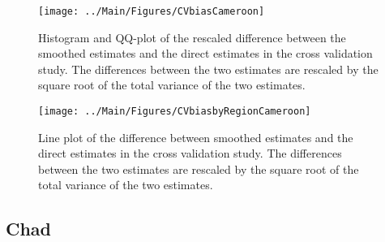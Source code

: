 \documentclass[12pt]{article}\usepackage[]{graphicx}\usepackage[]{color}
\newenvironment{knitrout}{}{} %
\begin{document}
\begin{knitrout}
\color{fgcolor}\begin{figure}[bht]

{\centering \texttt{[image: ../Main/Figures/CVbiasCameroon]} 

}

\caption[Histogram and QQ-plot of the rescaled difference between the smoothed estimates and the direct estimates in the cross validation study]{Histogram and QQ-plot of the rescaled difference between the smoothed estimates and the direct estimates in the cross validation study. The differences between the two estimates are rescaled by the square root of the total variance of the two estimates.}\label{fig:unnamed-chunk-49}
\end{figure}


\end{knitrout}

\begin{knitrout}
\color{fgcolor}\begin{figure}[bht]

{\centering \texttt{[image: ../Main/Figures/CVbiasbyRegionCameroon]} 

}

\caption[Line plot of the difference between smoothed estimates and the direct estimates in the cross validation study]{Line plot of the difference between smoothed estimates and the direct estimates in the cross validation study. The differences between the two estimates are rescaled by the square root of the total variance of the two estimates.}\label{fig:unnamed-chunk-50}
\end{figure}


\end{knitrout}


\clearpage
\subsection{Chad}


\end{document}
